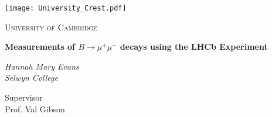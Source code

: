 \begin{titlepage}
  \centering
  \texttt{[image: University\_Crest.pdf]}\par\vspace{1cm}
  {\scshape\LARGE  University of Cambridge \par}
  \vspace{1cm}
  \vspace{1.5cm}
  {\LARGE\bfseries Measurements of $B \to \mu^{+} \mu^{-}$ decays using the LHCb Experiment \par}
  \vspace{2cm}
  {\Large\itshape Hannah Mary Evans\\
    Selwyn College\par}
  \vfill
  {\large
  Supervisor  \\
  Prof. Val Gibson
  }
  \vfill

  {\large }
\end{titlepage}

